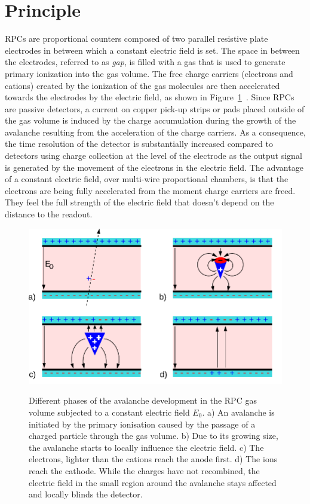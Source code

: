 \section{Principle}
\label{chapt3:sec:principle}

	RPCs are proportional counters composed of two parallel resistive plate electrodes in between which a constant electric field is set. The space in between the electrodes, referred to as \textit{gap}, is filled with a gas that is used to generate primary ionization into the gas volume. The free charge carriers (electrons and cations) created by the ionization of the gas molecules are then accelerated towards the electrodes by the electric field, as shown in Figure~\ref{fig:RPC_principle}~\cite{LIPPMANN2003}. Since RPCs are passive detectors, a current on copper pick-up strips or pads placed outside of the gas volume is induced by the charge accumulation during the growth of the avalanche resulting from the acceleration of the charge carriers. As a consequence, the time resolution of the detector is substantially increased compared to detectors using charge collection at the level of the electrode as the output signal is generated by the movement of the electrons in the electric field. The advantage of a constant electric field, over multi-wire proportional chambers, is that the electrons are being fully accelerated from the moment charge carriers are freed. They feel the full strength of the electric field that doesn't depend on the distance to the readout.
	
	\begin{figure}[H]
		\centering
		\includegraphics[width = \plotwidth]{fig/chapt3/RPC_principle.pdf}\\
		\caption{\label{fig:RPC_principle} Different phases of the avalanche development in the RPC gas volume subjected to a constant electric field $E_0$. a) An avalanche is initiated by the primary ionisation caused by the passage of a charged particle through the gas volume. b) Due to its growing size, the avalanche starts to locally influence the electric field. c) The electrons, lighter than the cations reach the anode first. d) The ions reach the cathode. While the charges have not recombined, the electric field in the small region around the avalanche stays affected and locally blinds the detector.}
	\end{figure}
	
